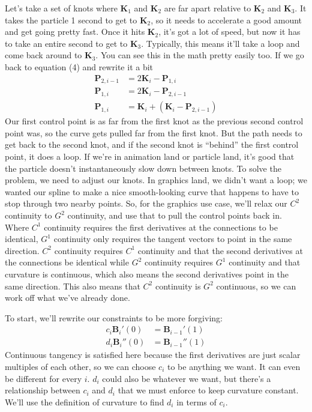 \documentclass[10pt]{article}
\renewcommand{\vec}[1]{\mathbf{#1}}
\begin{document}
	Let's take a set of knots where $\vec{K}_{1}$ and $\vec{K}_{2}$ are far
	apart relative to $\vec{K}_{2}$ and $\vec{K}_{3}$. It takes the particle
	1 second to get to $\vec{K}_{2}$, so it needs to accelerate a good amount
	and get going pretty fast. Once it hits $\vec{K}_{2}$, it's got a lot of
	speed, but now it has to take an entire second to get to $\vec{K}_{3}$.
	Typically, this means it'll take a loop and come back around to
	$\vec{K}_{3}$. You can see this in the math pretty easily too. If we go back
	to equation (4) and rewrite it a bit
	\begin{align*}
		\vec{P}_{2,i-1} &= 2\vec{K}_{i}-\vec{P}_{1,i}\\
		\vec{P}_{1,i} &= 2\vec{K}_{i}-\vec{P}_{2,i-1}\\
		\vec{P}_{1,i} &= \vec{K}_{i}+(\vec{K}_{i}-\vec{P}_{2,i-1})
	\end{align*}
	Our first control point is as far from the first knot as the previous second
	control point was, so the curve gets pulled far from the first knot. But
	the path needs to get back to the second knot, and if the second knot is
	``behind'' the first control point, it does a loop. If we're in animation
	land or particle land, it's good that the particle doesn't instantaneously
	slow down between knots. To solve the problem, we need to adjust our knots.
	In graphics land, we didn't want a loop; we wanted our spline to make a nice
	smooth-looking curve that happens to have to stop through two nearby points.
	So, for the graphics use case, we'll relax our $C^{2}$ continuity to $G^{2}$
	continuity, and use that to pull the control points back in. Where $C^{1}$
	continuity requires the first derivatives at the connections to be
	identical, $G^{1}$ continuity only requires the tangent vectors to point in
	the same direction. $C^{2}$ continuity requires $C^{1}$ continuity and that
	the second derivatives at the connections be identical while $G^{2}$
	continuity requires $G^{1}$ continuity and that curvature is continuous,
	which also means the second derivatives point in the same direction. This
	also means that $C^{2}$ continuity is $G^{2}$ continuous, so we can work off
	what we've already done.

	To start, we'll rewrite our constraints to be more forgiving:
	\begin{align*}
		c_{i}\vec{B}_{i}'(0) &= \vec{B}_{i-1}'(1)\nonumber\\
		d_{i}\vec{B}_{i}''(0) &= \vec{B}_{i-1}''(1)\nonumber
	\end{align*}
	Continuous tangency is satisfied here because the first derivatives are
	just scalar multiples of each other, so we can choose $c_{i}$ to be anything
	we want. It can even be different for every $i$. $d_{i}$ could also be
	whatever we want, but there's a relationship between $c_{i}$ and $d_{i}$
	that we must enforce to keep curvature constant. We'll use the definition
	of curvature to find $d_{i}$ in terms of $c_{i}$.
\end{document}

